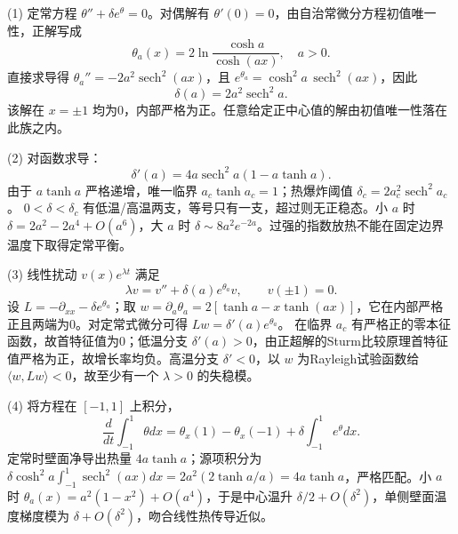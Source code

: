 (1) 定常方程 \(\theta''+\delta e^\theta=0\)。对偶解有 \(\theta'(0)=0\)，由自治常微分方程初值唯一性，正解写成
\[
\theta_a(x)=2\ln\frac{\cosh a}{\cosh(ax)},\quad a>0.
\]
直接求导得 \(\theta_a''=-2a^2\operatorname{sech}^2(ax)\)，且
\(e^{\theta_a}=\cosh^2 a\,\operatorname{sech}^2(ax)\)，因此
\[
\delta(a)=2a^2\operatorname{sech}^2a.
\]
该解在 \(x=\pm1\) 均为0，内部严格为正。任意给定正中心值的解由初值唯一性落在此族之内。

(2) 对函数求导：
\[
\delta'(a)=4a\operatorname{sech}^2a(1-a\tanh a).
\]
由于 \(a\tanh a\) 严格递增，唯一临界 \(a_c\tanh a_c=1\)；热爆炸阈值
\(\delta_c=2a_c^2\operatorname{sech}^2a_c\)。
\(0<\delta<\delta_c\) 有低温/高温两支，等号只有一支，超过则无正稳态。小 \(a\) 时 \(\delta=2a^2-2a^4+O(a^6)\)，大 \(a\) 时 \(\delta\sim8a^2e^{-2a}\)。过强的指数放热不能在固定边界温度下取得定常平衡。

(3) 线性扰动 \(v(x)e^{\lambda t}\) 满足
\[
\lambda v=v''+\delta(a)e^{\theta_a}v,\qquad v(\pm1)=0.
\]
设 \(L=-\partial_{xx}-\delta e^{\theta_a}\)；取
\(w=\partial_a\theta_a=2[\tanh a-x\tanh(ax)]\)，它在内部严格正且两端为0。对定常式微分可得
\(Lw=\delta'(a)e^{\theta_a}\)。
在临界 \(a_c\) 有严格正的零本征函数，故首特征值为0；低温分支 \(\delta'(a)>0\)，由正超解的Sturm比较原理首特征值严格为正，故增长率均负。高温分支 \(\delta'<0\)，以 \(w\) 为Rayleigh试验函数给 \(\langle w,Lw\rangle<0\)，故至少有一个 \(\lambda>0\) 的失稳模。

(4) 将方程在 \([-1,1]\) 上积分，
\[
\frac d{dt}\int_{-1}^1\theta dx
=\theta_x(1)-\theta_x(-1)+\delta\int_{-1}^1e^\theta dx.
\]
定常时壁面净导出热量 \(4a\tanh a\)；源项积分为
\(\delta\cosh^2a\int_{-1}^1\operatorname{sech}^2(ax)dx
=2a^2(2\tanh a/a)=4a\tanh a\)，严格匹配。小 \(a\) 时
\(\theta_a(x)=a^2(1-x^2)+O(a^4)\)，于是中心温升 \(\delta/2+O(\delta^2)\)，单侧壁面温度梯度模为 \(\delta+O(\delta^2)\)，吻合线性热传导近似。
